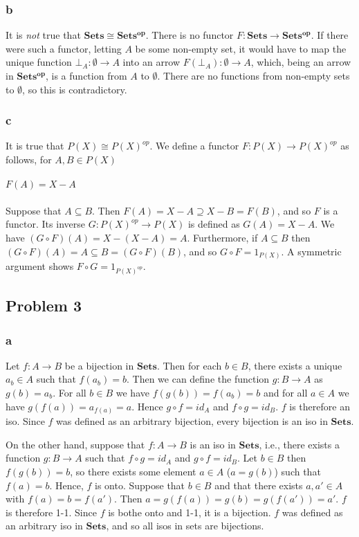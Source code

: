 \documentclass{article}
\newcommand{\mbf}{\mathbf}
\begin{document}
\subsubsection{b} It is \emph{not} true that $\mbf{Sets} \cong \mbf{Sets^{op}}$.
There is no functor $F : \mbf{Sets} \to \mbf{Sets^{op}}$. If there were such a functor,
letting $A$ be some non-empty set, it would have to map the unique function 
$\bot_A : \emptyset \to A$ into an arrow $F(\bot_A) : \emptyset \to A$, which, being an arrow in $\mbf{Sets^{op}}$,
is a function from $A$ to $\emptyset$. There are no functions from non-empty sets to $\emptyset$, so this is contradictory.

\subsubsection{c} It is true that $P(X) \cong P(X)^{op}$. We define a functor $F : P(X) \to P(X)^{op}$ as follows, for
$A,B \in P(X)$\\~\\
$F(A) = X-A$\\~\\
Suppose that $A \subseteq B$. Then $F(A) = X-A \supseteq X-B = F(B)$, and so $F$ is a functor.
Its inverse $G : P(X)^{op} \to P(X)$ is defined as $G(A) = X - A$.
We have $(G \circ F)(A) = X - (X - A) = A$.
Furthermore, if $A \subseteq B$ then $(G \circ F)(A) = A \subseteq B = (G \circ F)(B)$,
and so $G \circ F = 1_{P(X)}$. A symmetric argument shows $F \circ G = 1_{P(X)^{op}}$.

\subsection{Problem 3}

\subsubsection{a}

Let $f : A \to B$ be a bijection in $\mbf{Sets}$. Then for each $b \in B$, there exists a unique
$a_b \in A$ such that $f(a_b) = b$. Then we can define the function $g : B \to A$ as $g(b) = a_b$.
For all $b \in B$ we have $f(g(b)) = f(a_b) = b$ and for all $a \in A$ we have $g(f(a)) = a_{f(a)} = a$. 
Hence $g \circ f = id_A$ and $f \circ g = id_B$. $f$ is therefore an iso. Since $f$ was defined
as an arbitrary bijection, every bijection is an iso in $\mbf{Sets}$.

On the other hand, suppose that $f : A \to B$ is an iso in $\mbf{Sets}$, i.e., there exists a function 
$g : B \to A$ such that $f \circ g = id_A$ and $g \circ f = id_B$. Let $b \in B$ then $f(g(b)) = b$,
so there exists some element $a \in A$ ($a = g(b)$) such that $f(a) = b$. Hence, $f$ is onto.
Suppose that $b \in B$ and that there exists $a,a' \in A$ with $f(a) = b = f(a')$.
Then $a = g(f(a)) = g(b) = g(f(a')) = a'$. $f$ is therefore 1-1. Since $f$ is bothe
onto and 1-1, it is a bijection. $f$ was defined as an arbitrary iso in $\mbf{Sets}$, and so
all isos in sets are bijections.
\end{document}
